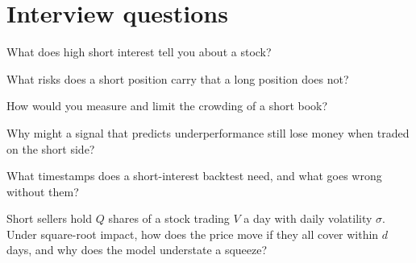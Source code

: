 \section{Interview questions}

\begin{interviewq}\label{iq:s1:short-interest-borrow-and-crowding:1}
What does high short interest tell you about a stock?
\end{interviewq}

\begin{interviewq}\label{iq:s1:short-interest-borrow-and-crowding:2}
What risks does a short position carry that a long position does not?
\end{interviewq}

\begin{interviewq}\label{iq:s1:short-interest-borrow-and-crowding:3}
How would you measure and limit the crowding of a short book?
\end{interviewq}

\begin{interviewq}\label{iq:s1:short-interest-borrow-and-crowding:4}
Why might a signal that predicts underperformance still lose money when traded on the short side?
\end{interviewq}

\begin{interviewq}\label{iq:s1:short-interest-borrow-and-crowding:5}
What timestamps does a short-interest backtest need, and what goes wrong without them?
\end{interviewq}

\begin{interviewq}\label{iq:s1:short-interest-borrow-and-crowding:6}
Short sellers hold $Q$ shares of a stock trading $V$ a day with daily volatility $\sigma$. Under square-root impact, how does the price move if they all
cover within $d$ days, and why does the model understate a squeeze?
\end{interviewq}
